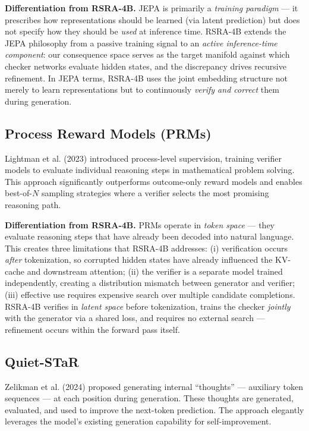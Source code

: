 \documentclass[11pt,a4paper]{article}
\theoremstyle{definition}
\begin{document}
\textbf{Differentiation from RSRA-4B.} JEPA is primarily a \textit{training paradigm} --- it prescribes how representations should be learned (via latent prediction) but does not specify how they should be \textit{used} at inference time. RSRA-4B extends the JEPA philosophy from a passive training signal to an \textit{active inference-time component}: our consequence space serves as the target manifold against which checker networks evaluate hidden states, and the discrepancy drives recursive refinement. In JEPA terms, RSRA-4B uses the joint embedding structure not merely to learn representations but to continuously \textit{verify and correct} them during generation.

\subsection{Process Reward Models (PRMs)}

Lightman et al. (2023) introduced process-level supervision, training verifier models to evaluate individual reasoning steps in mathematical problem solving. This approach significantly outperforms outcome-only reward models and enables best-of-$N$ sampling strategies where a verifier selects the most promising reasoning path.

\textbf{Differentiation from RSRA-4B.} PRMs operate in \textit{token space} --- they evaluate reasoning steps that have already been decoded into natural language. This creates three limitations that RSRA-4B addresses: (i) verification occurs \textit{after} tokenization, so corrupted hidden states have already influenced the KV-cache and downstream attention; (ii) the verifier is a separate model trained independently, creating a distribution mismatch between generator and verifier; (iii) effective use requires expensive search over multiple candidate completions. RSRA-4B verifies in \textit{latent space} before tokenization, trains the checker \textit{jointly} with the generator via a shared loss, and requires no external search --- refinement occurs within the forward pass itself.

\subsection{Quiet-STaR}

Zelikman et al. (2024) proposed generating internal ``thoughts'' --- auxiliary token sequences --- at each position during generation. These thoughts are generated, evaluated, and used to improve the next-token prediction. The approach elegantly leverages the model's existing generation capability for self-improvement.
\end{document}
